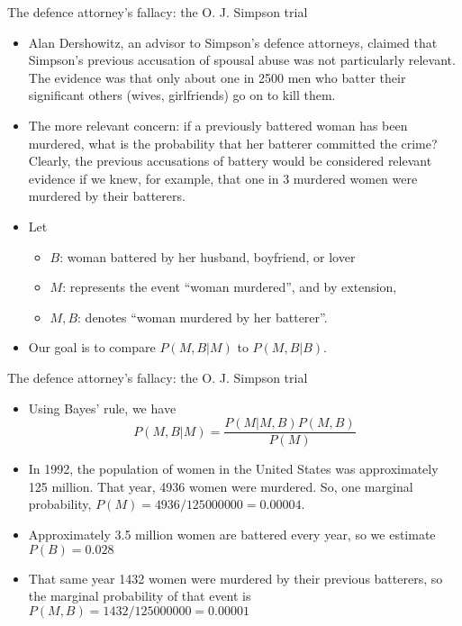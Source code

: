 \documentclass[10pt,handout]{beamer}\usepackage[]{graphicx}\usepackage[]{color}
\begin{document}
\begin{frame}{The defence attorney's fallacy:
the O. J. Simpson trial}
	\begin{itemize}
		\item Alan Dershowitz, an advisor to
		Simpson’s defence attorneys, claimed that
		Simpson’s previous accusation of spousal
		abuse was not particularly relevant. The
		evidence was that only about one in 2500
		men who batter their significant others (wives,
		girlfriends) go on to kill them. \pause 
		\item The more relevant concern:
		if a previously battered woman has been
		murdered, what is the probability that her
		batterer committed the crime? Clearly,
		the previous accusations of battery would be
		considered relevant evidence if we knew, for example, that
		one in 3 murdered women were murdered by
		their batterers. \pause 
		\item Let 
		\begin{itemize}
			\item $B$: woman battered by her husband, boyfriend,
or lover
			\item $M$: represents the event “woman
murdered”, and by extension, 
			\item $M,B$: denotes
“woman murdered by her batterer”. 
			\end{itemize}
		\item Our goal is to compare $P(M,B|M)$ to $P(M,B|B)$.
	\end{itemize}
	
\end{frame}


\begin{frame}{The defence attorney's fallacy:
the O. J. Simpson trial}
	\vspace*{-.71in}
	\begin{itemize}
		\item Using Bayes’ rule, we have
		$$P(M, B | M) = \frac{P(M | M, B) P(M, B)}{P(M)}$$ \pause 
		\item In 1992, the population of women
		in the United States was approximately
		125 million. That year, 4936 women were
		murdered. So, one marginal probability, $P(M)
= 4936/125 000 000 = 0.000 04$. 
		\item Approximately 3.5 million women
are battered every year, so we estimate $P(B) = 0.028$
		\item That
same year 1432 women were murdered by their
previous batterers, so the marginal probability
		of that event is $P(M, B) = 1432/125 000 000 =
0.000 01$
	\end{itemize}
	
\end{frame}
\end{document}
